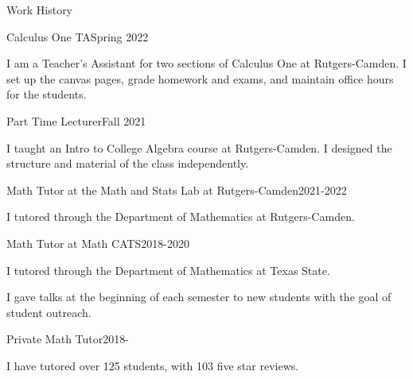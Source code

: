 \documentclass{resume} %
\begin{document}
\begin{rSection}{Work History}
\begin{rSubsection}{Calculus One TA}{Spring 2022}{}{}
\item I am a Teacher's Assistant for two sections of Calculus One at Rutgers-Camden. I set up the canvas pages, grade homework and exams, and maintain office hours for the students.
\end{rSubsection}

\begin{rSubsection}{Part Time Lecturer}{Fall 2021}{}{}
\item I taught an Intro to College Algebra course at Rutgers-Camden. I designed the structure and material of the class independently.
\end{rSubsection}

\begin{rSubsection}{Math Tutor at the Math and Stats Lab at Rutgers-Camden}{2021-2022}{}{}
\item I tutored through the Department of Mathematics at Rutgers-Camden.
\end{rSubsection}

\begin{rSubsection}{Math Tutor at Math CATS}{2018-2020}{}{}
\item I tutored through the Department of Mathematics at Texas State. 
\item I gave talks at the beginning of each semester to new students with the goal of student outreach.
\end{rSubsection}

\begin{rSubsection}{Private Math Tutor}{2018-}{}{}
\item I have tutored over 125 students, with 103 five star reviews.
\end{rSubsection}

\end{rSection} 

\end{document}
